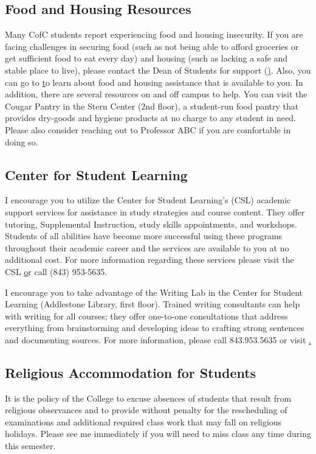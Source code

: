 \subsection{Food and Housing Resources}

Many CofC students report experiencing food and housing insecurity. If you are facing challenges in securing food (such as not being able to afford groceries or get sufficient food to eat every day) and housing (such as lacking a safe and stable place to live), please contact the Dean of Students for support (\href{http://studentaffairs.cofc.edu/about/salt.php}). Also, you can go to \href{http://studentaffairs.cofc.edu/student-food-housing-insecurity/index.php} to learn about food and housing assistance that is available to you. In addition, there are several resources on and off campus to help. You can visit the Cougar Pantry in the Stern Center (2nd floor), a student-run food pantry that provides dry-goods and hygiene products at no charge to any student in need. Please also consider reaching out to Professor ABC if you are comfortable in doing so. 


\subsection{Center for Student
Learning}\label{center-for-student-learning}

I encourage you to utilize the Center for Student Learning's (CSL)
academic support services for assistance in study strategies and course
content. They offer tutoring, Supplemental Instruction, study skills
appointments, and workshops. Students of all abilities have become more
successful using these programs throughout their academic career and the
services are available to you at no additional cost. For more
information regarding these services please visit the CSL
\href{http://csl.cofc.edu} or call (843) 953-5635.

\vspace{0.10in}
\noindent I encourage you to take advantage of the Writing Lab in the Center for Student Learning (Addlestone Library, first floor). Trained writing consultants can help with writing for all courses; they offer one-to-one consultations that address everything from brainstorming and developing ideas to crafting strong sentences and documenting sources. For more information, please call 843.953.5635 or visit \href{http://csl.cofc.edu/labs/writing-lab/}.


\subsection{Religious Accommodation for Students}\label{religious-holiday-policy}

It is the policy of the College to excuse absences of students that
result from religious observances and to provide without penalty for the
rescheduling of examinations and additional required class work that may
fall on religious holidays. Please see me immediately if you will need
to miss class any time during this semester.
